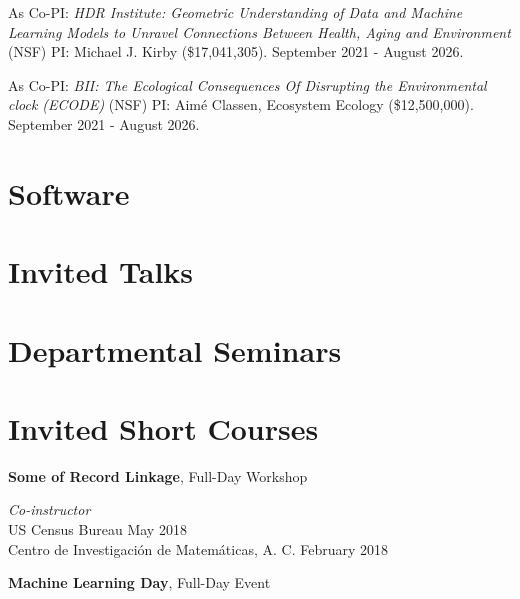 \documentclass[margin,line]{res}
\begin{document}
\begin{resume}
As Co-PI: {\em HDR Institute: Geometric Understanding of Data and Machine Learning Models to Unravel Connections Between Health, Aging and Environment} (NSF) PI: Michael J. Kirby (\$17,041,305). September 2021 - August 2026.
 
As Co-PI: {\em BII: The Ecological Consequences Of Disrupting the Environmental clock (ECODE)} (NSF) PI: Aim\'{e} Classen, Ecosystem Ecology (\$12,500,000). September 2021 - August 2026. 

\section{\sc Software}
\printbibliography[keyword=packages, heading=none, resetnumbers=true]

\section{\sc Invited Talks}
\printbibliography[keyword=talk-invited, heading=none, resetnumbers=true]

\section{\sc Departmental Seminars}
\printbibliography[keyword=seminar, heading=none, resetnumbers=true]

\section{\sc Invited Short Courses}

{\bf Some of Record Linkage},  Full-Day Workshop

\vspace{-.4cm}
{\em Co-instructor} \hfill \\

\vspace{-.7cm}
US Census Bureau \hfill May 2018 \\

\vspace{-.7cm}
Centro de Investigaci\'{o}n de Matem\'{a}ticas, A. C. \hfill February 2018



{\bf Machine Learning Day}, Full-Day Event


\end{resume}
\end{document}
